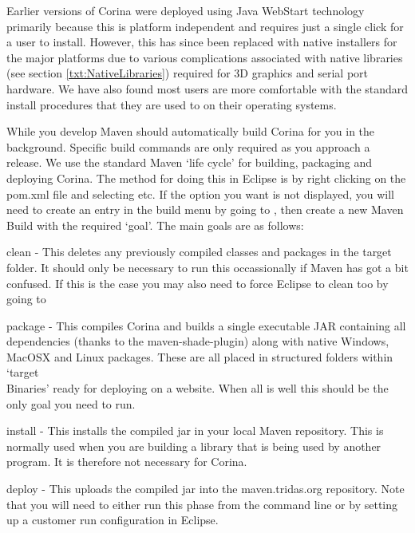 Earlier versions of Corina were deployed using Java WebStart technology primarily because this is platform independent and requires just a single click for a user to install.  However, this has since been replaced with native installers for the major platforms due to various complications associated with native libraries (see section \ref{txt:NativeLibraries}) required for 3D graphics and serial port hardware.  We have also found most users are more comfortable with the standard install procedures that they are used to on their operating systems.

While you develop Maven should automatically build Corina for you in the background.  Specific build commands are only required as you approach a release.  We use the standard Maven `life cycle' for building, packaging and deploying Corina.  The method for doing this in Eclipse is by right clicking on the pom.xml file and selecting  etc.  If the option you want is not displayed, you will need to create an entry in the build menu by going to , then create a new Maven Build with the required `goal'.   The main goals are as follows:

\begin{description*}
 \item[clean] - This deletes any previously compiled classes and packages in the target folder.  It should only be necessary to run this occassionally if Maven has got a bit confused.  If this is the case you may also need to force Eclipse to clean too by going to 
 \item[package] - This compiles Corina and builds a single executable JAR containing all dependencies (thanks to the maven-shade-plugin) along with native Windows, MacOSX and Linux packages.  These are all placed in structured folders within `target\\Binaries' ready for deploying on a website.  When all is well this should be the only goal you need to run.
 \item[install] - This installs the compiled jar in your local Maven repository. This is normally used when you are building a library that is being used by another program.  It is therefore not necessary for Corina.
 \item[deploy] - This uploads the compiled jar into the maven.tridas.org repository.  Note that you will need to either run this phase from the command line or by setting up a customer run configuration in Eclipse.
\end{description*}

